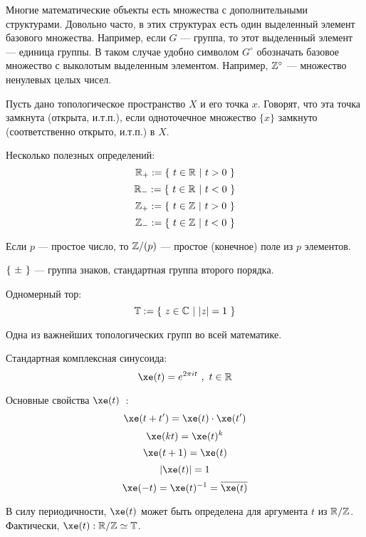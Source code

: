 




\SScover


\SSbullet

\SSsect Многие математические объекты есть множества с дополнительными структурами.
Довольно часто, в этих структурах есть один выделенный элемент базового множества. 
Например, если \( G \) --- группа, то этот выделенный элемент --- единица группы. 
В таком случае удобно символом \( G^\circ \) обозначать базовое множество с выколотым выделенным элементом.
Например, \( \mathbb{Z}^\circ \) --- множество ненулевых целых чисел.

\SSsect Пусть дано топологическое пространство \( X \) и его точка \( x \). Говорят, что эта точка замкнута (открыта, и.т.п.), если одноточечное множество \( \{ x \} \) замкнуто (соответственно открыто, и.т.п.) в \( X \).

\SSsect Несколько полезных определений:
\[ \mathbb{R}_+ := \left\lbrace~  t \in \mathbb{R}  ~|~  t>0  ~\right\rbrace \]
\[ \mathbb{R}_- := \left\lbrace~  t \in \mathbb{R}  ~|~  t<0  ~\right\rbrace \]
\[ \mathbb{Z}_+ := \left\lbrace~  t \in \mathbb{Z}  ~|~  t>0  ~\right\rbrace \]
\[ \mathbb{Z}_- := \left\lbrace~  t \in \mathbb{Z}  ~|~  t<0  ~\right\rbrace \]

\SSsect Если \( p \) --- простое число, то \( \mathbb{Z}/(p) \) --- простое (конечное) поле из \( p \) элементов.

\SSsect \( \left\lbrace~\pm~\right\rbrace \) --- группа знаков, стандартная группа второго порядка.

\SSsect Одномерный тор: 
\[ \mathbb{T} := \left\lbrace~  z \in \mathbb{C}  ~|~  |z|=1  ~\right\rbrace \]

Одна из важнейших топологических групп во всей математике.

\SSsect Стандартная комплексная синусоида:
\[ \xe(t) = e^{2 \pi i t} ~,~ t \in \xR \]

\SSsect Основные свойства \( \xe(t) \)~:
\[
\xe(t+t') = \xe(t) \cdot \xe(t')
\]
\[
\xe(kt) = \xe(t)^k
\]
\[
\xe(t+1) = \xe(t)
\]
\[
|\xe(t)| = 1
\]
\[
\xe(-t) = \xe(t)^{-1} = \overline{\xe(t)}
\]

\SSsect В силу периодичности, \( \xe(t) \) может быть определена для аргумента \( t \) из \( \mathbb{R}/\mathbb{Z} \). 
Фактически, \( \xe(t) : \xR/\xZ \simeq \xT \).



